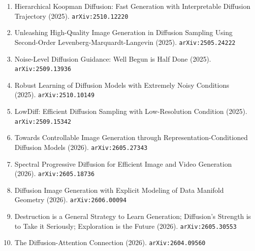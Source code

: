 \documentclass[11pt]{article}
\begin{document}
\begin{enumerate}
  \item Hierarchical Koopman Diffusion: Fast Generation with Interpretable Diffusion Trajectory (2025). \texttt{arXiv:2510.12220}
  \item Unleashing High-Quality Image Generation in Diffusion Sampling Using Second-Order Levenberg-Marquardt-Langevin (2025). \texttt{arXiv:2505.24222}
  \item Noise-Level Diffusion Guidance: Well Begun is Half Done (2025). \texttt{arXiv:2509.13936}
  \item Robust Learning of Diffusion Models with Extremely Noisy Conditions (2025). \texttt{arXiv:2510.10149}
  \item LowDiff: Efficient Diffusion Sampling with Low-Resolution Condition (2025). \texttt{arXiv:2509.15342}
  \item Towards Controllable Image Generation through Representation-Conditioned Diffusion Models (2026). \texttt{arXiv:2605.27343}
  \item Spectral Progressive Diffusion for Efficient Image and Video Generation (2026). \texttt{arXiv:2605.18736}
  \item Diffusion Image Generation with Explicit Modeling of Data Manifold Geometry (2026). \texttt{arXiv:2606.00094}
  \item Destruction is a General Strategy to Learn Generation; Diffusion's Strength is to Take it Seriously; Exploration is the Future (2026). \texttt{arXiv:2605.30553}
  \item The Diffusion-Attention Connection (2026). \texttt{arXiv:2604.09560}
\end{enumerate}
\end{document}
